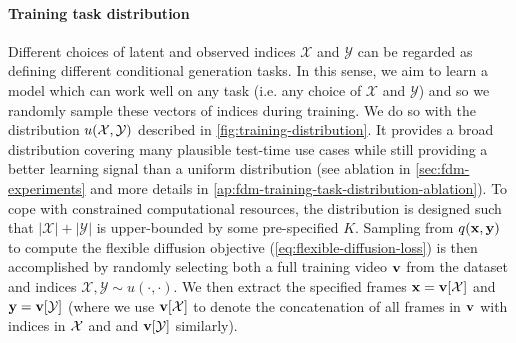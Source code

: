 \paragraph{Training task distribution}
Different choices of latent and observed indices $\mathcal{X}$ and $\mathcal{Y}$ can be regarded as defining different conditional generation tasks. In this sense, we aim to learn a model which can work well on any task (i.e. any choice of $\mathcal{X}$ and $\mathcal{Y}$) and so we randomly sample these vectors of indices during training. We do so with the distribution $u(\mathcal{X},\mathcal{Y})$ described in \cref{fig:training-distribution}. It provides a broad distribution covering many plausible test-time use cases while still providing a better learning signal than a uniform distribution (see ablation in \cref{sec:fdm-experiments} and more details in \cref{ap:fdm-training-task-distribution-ablation}). To cope with constrained computational resources, the distribution is designed such that $|\mathcal{X}|+|\mathcal{Y}|$ is upper-bounded by some pre-specified $K$. Sampling from $q({\mathbf{x}}, {\mathbf{y}})$ to compute the flexible diffusion objective (\cref{eq:flexible-diffusion-loss}) is then accomplished by randomly selecting both a full training video ${\mathbf{v}}$ from the dataset and indices $\mathcal{X},\mathcal{Y}\sim u(\cdot,\cdot)$. We then extract the specified frames ${\mathbf{x}} = {\mathbf{v}}[\mathcal{X}]$ and ${\mathbf{y}} = {\mathbf{v}}[\mathcal{Y}]$ (where we use ${\mathbf{v}}[\mathcal{X}]$ to denote the concatenation of all frames in ${\mathbf{v}}$ with indices in $\mathcal{X}$ and and ${\mathbf{v}}[\mathcal{Y}]$ similarly).


